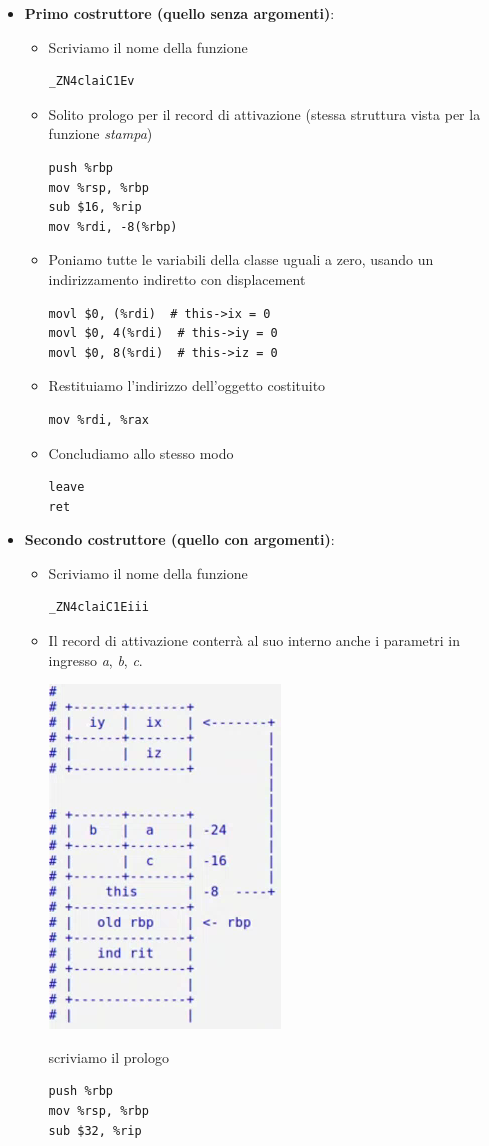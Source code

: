 \documentclass[11pt]{report}
\theoremstyle{definition}
\begin{document}
\begin{itemize}
\item \textbf{Primo costruttore (quello senza argomenti)}:
\begin{itemize}
\item Scriviamo il nome della funzione
\begin{verbatim}
_ZN4claiC1Ev
\end{verbatim}
\item Solito prologo per il record di attivazione (stessa struttura vista per la funzione \emph{stampa})
\begin{verbatim}
push %rbp
mov %rsp, %rbp
sub $16, %rip
mov %rdi, -8(%rbp)
\end{verbatim}
\item Poniamo tutte le variabili della classe uguali a zero, usando un indirizzamento indiretto con displacement
\begin{verbatim}
movl $0, (%rdi)  # this->ix = 0
movl $0, 4(%rdi)  # this->iy = 0
movl $0, 8(%rdi)  # this->iz = 0
\end{verbatim}
\item Restituiamo l'indirizzo dell'oggetto costituito
\begin{verbatim}
mov %rdi, %rax
\end{verbatim}
\item Concludiamo allo stesso modo
\begin{verbatim}
leave
ret
\end{verbatim}
\end{itemize}
\item \textbf{Secondo costruttore (quello con argomenti)}:
\begin{itemize}
\item Scriviamo il nome della funzione
\begin{verbatim}
_ZN4claiC1Eiii
\end{verbatim}
\item Il record di attivazione conterrà al suo interno anche i parametri in ingresso \emph{a}, \emph{b}, \emph{c}.
\begin{center}
\includegraphics{img/40.PNG}
\end{center}  
scriviamo il prologo
\begin{verbatim}
push %rbp
mov %rsp, %rbp
sub $32, %rip


\end{verbatim}
\end{itemize}
\end{itemize}
\end{document}
